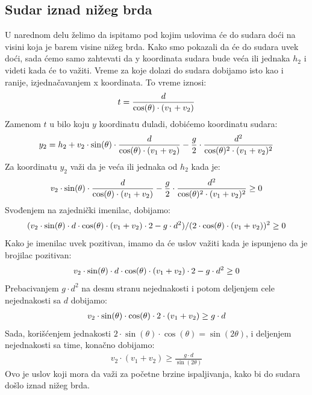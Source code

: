 \documentclass{article}
\begin{document}
\subsection{\huge Sudar iznad nižeg brda}\label{sec:sudarnize}
U narednom delu želimo da ispitamo pod kojim uslovima će do sudara doći na visini koja je barem visine nižeg brda.
\newline
Kako smo pokazali da će do sudara uvek doći, sada ćemo samo zahtevati da y koordinata sudara bude veća ili jednaka $h_2$ i videti kada će to važiti.
\newline
\newline
Vreme za koje dolazi do sudara dobijamo isto kao i ranije, izjednačavanjem x koordinata. To vreme iznosi:
\begin{align}
    t = \frac{d}{\cos(\theta) \cdot (v_1 + v_2)} \notag
\end{align}
Zamenom $t$ u bilo koju $y$ koordinatu đuladi, dobićemo koordinatu sudara:
\begin{align}
   y_2 = h_2 + v_2 \cdot \sin(\theta) \cdot \frac{d}{\cos(\theta) \cdot (v_1 + v_2)} - \frac{g}{2} \cdot \frac{d^2}{\cos(\theta)^2 \cdot (v_1 + v_2)^2} \notag
\end{align}
Za koordinatu $y_2$ važi da je veća ili jednaka od $h_2$ kada je:
\begin{align}
    v_2 \cdot \sin(\theta) \cdot \frac{d}{\cos(\theta) \cdot (v_1 + v_2)} - \frac{g}{2} \cdot \frac{d^2}{\cos(\theta)^2 \cdot (v_1 + v_2)^2} \geq 0 \notag
\end{align}
Svođenjem na zajednički imenilac, dobijamo:
\begin{align}
    (v_2 \cdot \sin(\theta) \cdot d \cdot \cos(\theta) \cdot (v_1 + v_2) \cdot 2 - g \cdot d^2) / (2 \cdot \cos(\theta) \cdot (v_1 + v_2)) ^ 2  \geq 0 \notag
\end{align}
Kako je imenilac uvek pozitivan, imamo da će uslov važiti kada je ispunjeno da je brojilac pozitivan:
\begin{align}
    v_2 \cdot \sin(\theta) \cdot d \cdot \cos(\theta) \cdot (v_1 + v_2) \cdot 2 - g \cdot d^2 \geq 0 \notag
\end{align}
Prebacivanjem $g \cdot d^2$ na desnu stranu nejednakosti i potom deljenjem cele nejednakosti sa $d$ dobijamo:
\begin{align}
v_2 \cdot \sin(\theta) \cdot \cos(\theta) \cdot 2 \cdot (v_1 + v_2) \geq g \cdot d \notag  
\end{align}
Sada, korišćenjem jednakosti $2 \cdot \sin(\theta) \cdot \cos(\theta) = \sin (2\theta)$, i deljenjem nejednakosti sa time, konačno dobijamo:
\begin{align}
v_2 \cdot (v_1 + v_2) \geq \frac{g \cdot d}{\sin(2\theta)} \tag{12}   
\end{align}
Ovo je uslov koji mora da važi za početne brzine ispaljivanja, kako bi do sudara došlo iznad nižeg brda.
\newpage
\end{document}
